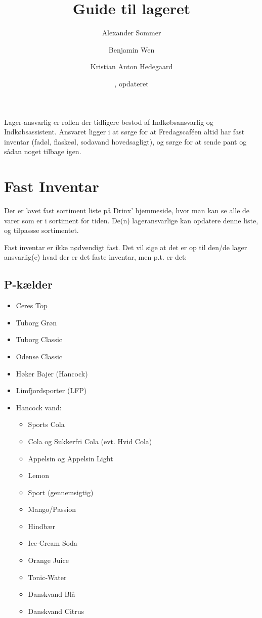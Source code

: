 

\title{Guide til lageret}
\author{Alexander Sommer \and Benjamin Wen \and Kristian Anton Hedegaard}
\date{, opdateret }



\maketitle

Lager-ansvarlig er rollen der tidligere bestod af Indkøbsansvarlig og Indkøbsassistent. Ansvaret ligger i at sørge for at Fredagscaféen altid har fast inventar (fadøl, flaskeøl, sodavand hovedsagligt), og sørge for at sende pant og sådan noget tilbage igen.

\section{Fast Inventar}

Der er lavet fast sortiment liste på Drinx' hjemmeside, hvor man kan se alle de varer som er i sortiment for tiden. De(n) lageransvarlige kan opdatere denne liste, og tilpassse sortimentet.

Fast inventar er ikke nødvendigt fast. Det vil sige at det er op til den/de lager ansvarlig(e) hvad der er det faste inventar, men p.t. er det: 

\subsection{P-kælder}

\begin{itemize}
    \item Ceres Top 
    \item Tuborg Grøn
    \item Tuborg Classic 
    \item Odense Classic
    \item Høker Bajer (Hancock)
    \item Limfjordsporter (LFP)
    \item Hancock vand:
    \begin{itemize}
        \item Sports Cola 
        \item Cola og Sukkerfri Cola (evt. Hvid Cola)
        \item Appelsin og Appelsin Light
        \item Lemon 
        \item Sport (gennemsigtig)
        \item Mango/Passion
        \item Hindbær
        \item Ice-Cream Soda
        \item Orange Juice
        \item Tonic-Water
        \item Danskvand Blå
        \item Danskvand Citrus
    \end{itemize}
\end{itemize}

